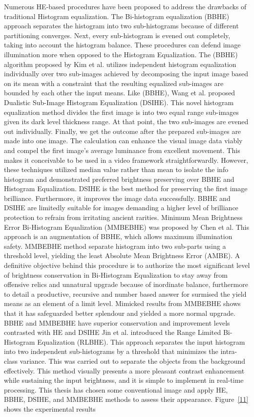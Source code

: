 \documentclass[doctor,english,listoffigures,listoftables]{thesis-uestc}
\begin{document}
Numerous  HE-based procedures have been proposed to address the drawbacks of traditional Histogram equalization. The Bi-histogram equalization (BBHE) approach separates the histogram into two sub-histograms because of different partitioning converges. Next, every sub-histogram is evened out completely, taking into account the histogram balance. These procedures can defend image illumination more when opposed to the Histogram Equalization. The (BBHE) algorithm proposed by Kim et al. utilizes independent histogram equalization individually over two sub-images achieved by decomposing the input image based on its mean with a constraint that the resulting equalized sub-images are bounded by each other the input means. Like (BBHE), Wang et al. proposed Dualistic Sub-Image Histogram Equalization (DSIHE). This novel histogram equalization method divides the first image is into two equal range sub-images given its dark level thickness range. At that point, the two sub-images are evened out individually. Finally, we get the outcome after the prepared sub-images are made into one image.  The calculation can enhance the visual image data viably and compel the first image's average luminance from excellent movement. This makes it conceivable to be used in a video framework straightforwardly. However, these techniques utilized median value rather than mean to isolate the info histogram and demonstrated preferred brightness preserving over BBHE and Histogram Equalization. DSIHE is the best method for preserving the first image brilliance. Furthermore, it improves the image data successfully. BBHE and DSIHE are limitedly suitable for images demanding a higher level of brilliance protection to refrain from irritating ancient rarities.
 Minimum Mean Brightness Error Bi-Histogram Equalization (MMBEBHE) was proposed by Chen et al. This approach is an augmentation of BBHE, which allows maximum illumination safety. MMBEBHE method separate histogram into two sub-parts using a threshold level, yielding the least Absolute Mean Brightness Error (AMBE). A definitive objective behind this procedure is to authorize the most significant level of brightness conservation in Bi-Histogram Equalization to stay away from offensive relics and unnatural upgrade because of inordinate balance, furthermore to detail a productive, recursive and number based answer for surmised the yield means as an element of a limit level. Mimicked results from MMBEBHE shows that it has safeguarded better splendour and yielded a more normal upgrade. BBHE and MMBEBHE have superior conservation and improvement levels contrasted with HE and DSIHE
Jin et al. introduced the Range Limited Bi-Histogram Equalization (RLBHE). This approach separates the input histogram into two independent sub-histograms by a threshold that minimizes the intra-class variance. This was carried out to separate the objects from the background effectively. This method visually presents a more pleasant contrast enhancement while sustaining the input brightness, and it is simple to implement in real-time processing. This thesis has chosen some conventional image and apply HE, BBHE, DSIHE, and MMBEBHE methods to assess their appearance. Figure~\ref{11} shows the experimental results
\end{document}
